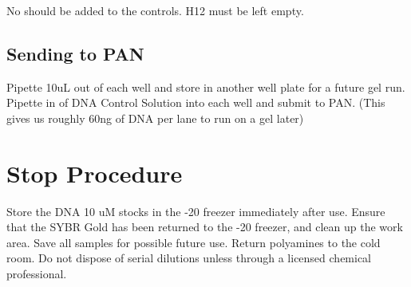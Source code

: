 \documentclass{ssiBio}
\begin{document}
No \tdt{} should be added to the controls. H12 must be left empty. 

\subsection{Sending to PAN}

Pipette 10uL out of each well and store in another well plate for a future gel run. Pipette in  of DNA Control Solution into each well and submit to PAN. (This gives us roughly 60ng of DNA per lane to run on a gel later)

\section{Stop Procedure}
Store the DNA 10 uM stocks in the -20 freezer immediately after use. Ensure that the SYBR Gold has been returned to the -20 freezer, and clean up the work area. Save all samples for possible future use.
Return polyamines to the cold room. Do not dispose of serial dilutions unless through a licensed chemical professional.

\begin{comment}
\subsection{Analysis}

\begin{figure}[ht]
\centering
\texttt{[image: ./gels/Gel\_1.png]}
\label{}
\caption{Gel 1}
\end{figure}



\end{comment}
\end{document}

